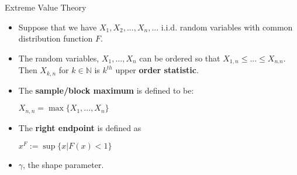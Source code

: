 \documentclass[notes]{beamer}
\begin{document}
\begin{frame}{Extreme Value Theory}
\begin{itemize}
\item Suppose that we have $X_1, X_2, ... , X_n, ... $ i.i.d. random variables with common distribution function $F$. 
\item The random variables, $X_1, ... , X_n$ can be ordered so that $X_{1,n} \le ... \le X_{n.n}$. Then $X_{k,n} $ for $k \in \mathbb{N}$ is $k^{th}$ upper \textbf{order statistic}.

\item The \textbf{sample/block maximum} is defined to be:

\begin{center} $ X_{n,n} = \max\{X_1, ... , X_n\}$ \end{center}

\item The \textbf{right endpoint} is defined as

\begin{center} $x^F := \sup\{x | F(x) < 1\}$ \end{center}

\item $\gamma$, the shape parameter.

\end{itemize}
\end{frame}
\end{document}
